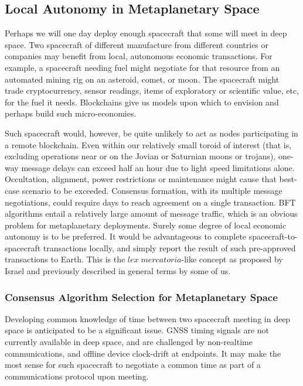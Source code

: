 \documentclass[]{aiaa-tc}%
\begin{document}
\subsection{Local Autonomy in Metaplanetary Space}

Perhaps we will one day deploy enough spacecraft that some will meet in deep space. Two spacecraft of different manufacture from different countries or companies may benefit from local, autonomous economic transactions. For example, a spacecraft needing fuel might negotiate for that resource from an automated mining rig on an asteroid, comet, or moon. The spacecraft might trade cryptocurrency, sensor readings, items of exploratory or scientific value, etc, for the fuel it needs. Blockchains give us models upon which to envision and perhaps build such micro-economies.

Such spacecraft would, however, be quite unlikely to act as nodes participating in a remote blockchain. Even within our relatively small toroid of interest (that is, excluding operations near or on the Jovian or Saturnian moons or trojans), one-way message delays can exceed half an hour due to light speed limitations alone. Occultation, alignment, power restrictions or maintenance might cause that best-case scenario to be exceeded. Consensus formation, with its multiple message negotiations, could require days to reach agreement on a single transaction. BFT algorithms entail a relatively large amount of message traffic, which is an obvious problem for metaplanetary deployments. Surely some degree of local economic autonomy is to be preferred. It would be advantageous to complete spacecraft-to-spacecraft transactions locally, and simply report the result of such pre-approved transactions to Earth. This is the $\mathit{lex\; mercatoria}$-like concept as proposed by Israel\cite{israel_space_2019} and previously described in general terms by some of us\cite{Hyland-Wood_COSPAR2019}.

\subsubsection{Consensus Algorithm Selection for Metaplanetary Space}

Developing common knowledge of time between two spacecraft meeting in deep space is anticipated to be a significant issue. GNSS timing signals are not currently available in deep space, and are challenged by non-realtime communications, and offline device clock-drift at endpoints. It may make the most sense for such spacecraft to negotiate a common time as part of a communications protocol upon meeting.
\end{document}
